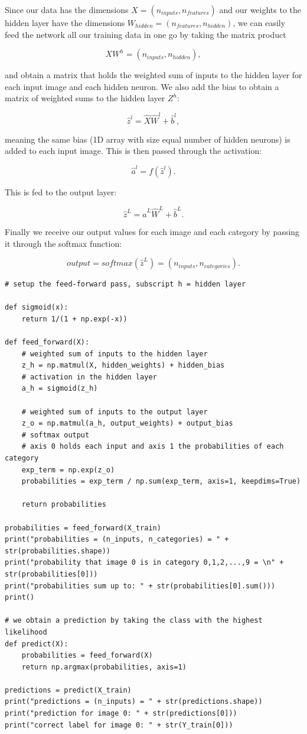 \documentclass[%
oneside,                 %
final,                   %
10pt]{article}
\begin{document}
Since our data has the dimensions $X = (n_{inputs}, n_{features})$ and our weights to the hidden
layer have the dimensions  
$W_{hidden} = (n_{features}, n_{hidden})$,
we can easily feed the network all our training data in one go by taking the matrix product  

$$ X W^{h} = (n_{inputs}, n_{hidden}),$$ 

and obtain a matrix that holds the weighted sum of inputs to the hidden layer
for each input image and each hidden neuron.    
We also add the bias to obtain a matrix of weighted sums to the hidden layer $Z^{h}$:  

$$ \hat{z}^{l} = \hat{X} \hat{W}^{l} + \hat{b}^{l} ,$$

meaning the same bias (1D array with size equal number of hidden neurons) is added to each input image.  
This is then passed through the activation:  

$$ \hat{a}^{l} = f(\hat{z}^l) .$$  

This is fed to the output layer:  

$$ \hat{z}^{L} = \hat{a}^{L} \hat{W}^{L} + \hat{b}^{L} .$$

Finally we receive our output values for each image and each category by passing it through the softmax function:  

$$ output = softmax (\hat{z}^{L}) = (n_{inputs}, n_{categories}) .$$


\begin{verbatim}
# setup the feed-forward pass, subscript h = hidden layer

def sigmoid(x):
    return 1/(1 + np.exp(-x))

def feed_forward(X):
    # weighted sum of inputs to the hidden layer
    z_h = np.matmul(X, hidden_weights) + hidden_bias
    # activation in the hidden layer
    a_h = sigmoid(z_h)
    
    # weighted sum of inputs to the output layer
    z_o = np.matmul(a_h, output_weights) + output_bias
    # softmax output
    # axis 0 holds each input and axis 1 the probabilities of each category
    exp_term = np.exp(z_o)
    probabilities = exp_term / np.sum(exp_term, axis=1, keepdims=True)
    
    return probabilities

probabilities = feed_forward(X_train)
print("probabilities = (n_inputs, n_categories) = " + str(probabilities.shape))
print("probability that image 0 is in category 0,1,2,...,9 = \n" + str(probabilities[0]))
print("probabilities sum up to: " + str(probabilities[0].sum()))
print()

# we obtain a prediction by taking the class with the highest likelihood
def predict(X):
    probabilities = feed_forward(X)
    return np.argmax(probabilities, axis=1)

predictions = predict(X_train)
print("predictions = (n_inputs) = " + str(predictions.shape))
print("prediction for image 0: " + str(predictions[0]))
print("correct label for image 0: " + str(Y_train[0]))
\end{verbatim}
\end{document}
